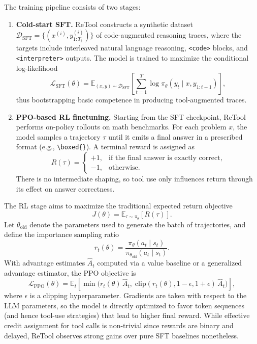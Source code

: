 \documentclass{article}
\begin{document}
The training pipeline consists of two stages:
\begin{enumerate}
  \item \textbf{Cold-start SFT.} ReTool constructs a synthetic dataset 
    $\mathcal{D}_\text{SFT} = \{ (x^{(i)}, y^{(i)}_{1:T_i}) \}$ of code-augmented 
    reasoning traces, where the targets include interleaved natural language 
    reasoning, \texttt{<code>} blocks, and \texttt{<interpreter>} outputs. The 
    model is trained to maximize the conditional log-likelihood
    \begin{equation}
      \mathcal{L}_\text{SFT}(\theta) 
      = \mathbb{E}_{(x, y) \sim \mathcal{D}_\text{SFT}}
        \left[ \sum_{t=1}^{T} \log \pi_\theta(y_t \mid x, y_{1:t-1}) \right],
    \end{equation}
    thus bootstrapping basic competence in producing tool-augmented traces.
  \item \textbf{PPO-based RL finetuning.} Starting from the SFT checkpoint, ReTool 
    performs on-policy rollouts on math benchmarks. For each problem $x$, the 
    model samples a trajectory $\tau$ until it emits a final answer in a 
    prescribed format (e.g., \verb|\boxed{}|). A terminal reward is assigned as
    \begin{equation}
      R(\tau) = 
      \begin{cases}
        +1, & \text{if the final answer is exactly correct}, \\
        -1, & \text{otherwise}.
      \end{cases}
    \end{equation}
    There is no intermediate shaping, so tool use only influences return 
    through its effect on answer correctness.
\end{enumerate}
The RL stage aims to maximize the traditional expected return objective
\begin{equation}
  J(\theta) = \mathbb{E}_{\tau \sim \pi_\theta} \left[ R(\tau) \right].
\end{equation}
Let $\theta_\text{old}$ denote the parameters used to 
generate the batch of trajectories, and define the importance sampling ratio
\begin{equation}
  r_t(\theta) 
  = \frac{\pi_\theta(a_t \mid s_t)}{\pi_{\theta_\text{old}}(a_t \mid s_t)}.
\end{equation}
With advantage estimates $\hat{A}_t$ computed via a value baseline or a 
generalized advantage estimator, the PPO objective is
\begin{equation}
  \mathcal{L}_\text{PPO}(\theta) 
  = \mathbb{E}_t \left[
      \min\big(
        r_t(\theta)\,\hat{A}_t,\;
        \mathrm{clip}(r_t(\theta), 1-\epsilon, 1+\epsilon)\,\hat{A}_t
      \big)
    \right],
\end{equation}
where $\epsilon$ is a clipping hyperparameter. Gradients are taken with respect to the 
LLM parameters, so the model is directly optimized to favor token sequences (and 
hence tool-use strategies) that lead to higher final reward. 
While effective credit assignment for tool calls is non-trivial since rewards are
binary and delayed, ReTool observes strong gains over pure SFT baselines nonetheless.
\end{document}
